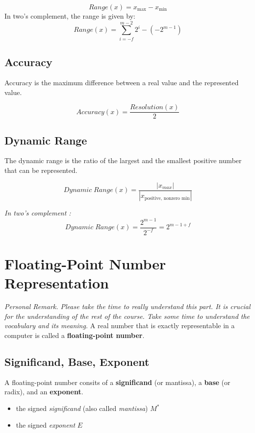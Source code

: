 \documentclass[12pt,openany]{book}
\begin{document}
			      	\[Range(x) = x_{\text{max}} - x_{\text{min}}\]
			      	\newblock
			      	\newline
			      	In two's complement, the range is given by:
			      	\[ Range(x) = \displaystyle\sum_{i=-f}^{m-2} 2^i - \left( -2^{m-1} \right)\]
			      	
			      	\subsection{Accuracy}
			      	Accuracy is the maximum difference between a real value and the represented value.
			      	
			      	$$Accuracy(x) = \frac{Resolution(x)}{2}$$
			      	
			      	\subsection{Dynamic Range}
			      	The dynamic range is the ratio of the largest and the smallest positive number that can be represented.
			      	
			      	$$Dynamic \; Range(x) = \frac{|x_{max}|}{|x_{\text{positive, nonzero min}}|}$$
			      	
			      	\textit{In two's complement :}
			      	$$Dynamic \; Range(x) = \frac{2^{m-1}}{2^{-f}} = 2^{m-1+f}$$
			      	
			      	\section{Floating-Point Number Representation}
			      	\textit{Personal Remark. Please take the time to really understand this part. It is crucial for the understanding of the rest of the course. Take some time to understand the vocabulary and its meaning.}\newline
			      	\vskip 0.5cm
			      	A real number that is exactly representable in a computer is called a \textbf{floating-point number}. 
			      	\subsection{Significand, Base, Exponent}
			      	A floating-point number consits of a \textbf{significand} (or mantissa), a \textbf{base} (or radix), and an \textbf{exponent}.
			      	\begin{itemize}
			      		\item[] the signed \textit{significand} (also called \textit{mantissa}) \( M^* \)
			      		\item[] the signed \textit{exponent} \( E \)
			      	\end{itemize}
			      	
\end{document}
